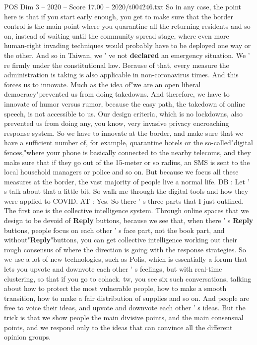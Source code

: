 \begin{textsample}{POS Dim 3 – 2020 – Score 17.00 – 2020/t004246.txt}
So in any case, the point here is that if you start early enough, you get to make sure that the border control is the main point where you quarantine all the returning residents and so on, instead of waiting until the community spread stage, where even more human-right invading techniques would probably have to be deployed one way or the other.
And so in Taiwan, we ' ve not \textbf{declared} an emergency situation.
We ' re firmly under the constitutional law.
Because of that, every measure the administration is taking is also applicable in non-coronavirus times.
And this forces us to innovate.
Much as the idea of"we are an open liberal democracy"prevented us from doing takedowns.
And therefore, we have to innovate of humor versus rumor, because the easy path, the takedown of online speech, is not accessible to us.
Our design criteria, which is no lockdowns, also prevented us from doing any, you know, very invasive privacy encroaching response system.
So we have to innovate at the border, and make sure that we have a sufficient number of, for example, quarantine hotels or the so-called"digital fences,"where your phone is basically connected to the nearby telecoms, and they make sure that if they go out of the 15-meter or so radius, an SMS is sent to the local household managers or police and so on.
But because we focus all these measures at the border, the vast majority of people live a normal life.
DB : Let ' s talk about that a little bit.
So walk me through the digital tools and how they were applied to COVID.
AT : Yes.
So there ' s three parts that I just outlined.
The first one is the collective intelligence system.
Through online spaces that we design to be devoid of \textbf{Reply} buttons, because we see that, when there ' s \textbf{Reply} buttons, people focus on each other ' s face part, not the book part, and without"\textbf{Reply}"buttons, you can get collective intelligence working out their rough consensus of where the direction is going with the response strategies.
So we use a lot of new technologies, such as Polis, which is essentially a forum that lets you upvote and downvote each other ' s feelings, but with real-time clustering, so that if you go to cohack. tw, you see six such conversations, talking about how to protect the most vulnerable people, how to make a smooth transition, how to make a fair distribution of supplies and so on.
And people are free to voice their ideas, and upvote and downvote each other ' s ideas.
But the trick is that we show people the main divisive points, and the main consensual points, and we respond only to the ideas that can convince all the different opinion groups.

\end{textsample}
